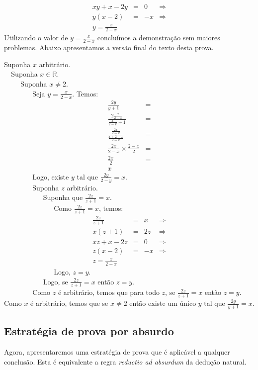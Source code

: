 \begin{Example}
\[\begin{array}{lclc}
xy + x - 2y & = & 0 & \Rightarrow \\
y(x - 2) & = & -x & \Rightarrow \\
y = \frac{x}{2 - x}
\end{array}
\]
Utilizando o valor de $y = \frac{x}{2 - x}$ concluímos a demonstração
sem maiores problemas. Abaixo apresentamos a versão final do texto
desta prova.
\begin{flushleft}
Suponha $x$ arbitrário.\\
\verb|  |Suponha $x\in\mathbb{R}$.\\
\verb|    | Suponha $x\neq 2$.\\
\verb|        |Seja $y = \frac{x}{2 - x}$. Temos:\\
\[
\begin{array}{lc}
\frac{2y}{y+1} & =\\
\frac{2\frac{x}{2 - x}}{\frac{x}{2 - x} + 1} & = \\
\frac{\frac{2x}{2- x}}{\frac{x + 2 - x}{2 - x}} & = \\
\frac{2x}{2 - x}\times\frac{2 - x}{2} & = \\
\frac{2x}{2} & = \\
x
\end{array}
\]
\verb|        |Logo, existe $y$ tal que $\frac{2y}{2- y} = x$.\\
\verb|        |Suponha $z$ arbitrário.\\
\verb|           |Suponha que $\frac{2z}{z + 1} = x$.\\
\verb|              |Como $\frac{2z}{z + 1} = x$, temos:\\
\[
\begin{array}{lclc}
\frac{2z}{z + 1} & = & x & \Rightarrow\\
x(z + 1) & = & 2z & \Rightarrow\\
xz + x - 2z & = & 0 & \Rightarrow \\
z(x - 2) & = & -x & \Rightarrow \\
z = \frac{x}{2 - x}
\end{array}
\]
\verb|              |Logo, $z = y$.\\
\verb|           |Logo, se $\frac{2z}{z + 1} = x$ então $z = y$.\\
\verb|        |Como $z$ é arbitrário, temos que para todo $z$, se $\frac{2z}{z + 1} = x$ então $z = y$.\\
Como $x$ é arbitrário, temos que se $x\neq 2$ então existe um único
$y$ tal que $\frac{2y}{y+1} = x$.
\end{flushleft}
\end{Example}

\subsection{Estratégia de prova por absurdo}

Agora, apresentaremos uma estratégia de prova que é aplicável a
qualquer conclusão. Esta é equivalente a regra \emph{reductio ad
  absurdum} da dedução natural.